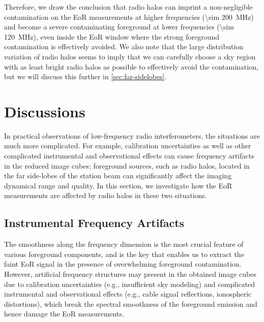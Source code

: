 \documentclass[modern]{aastex62}
\begin{document}
{Therefore, we draw the conclusion that radio halos can imprint a
non-negligible contamination on the EoR measurements at higher
frequencies (\SI{\sim 200}{\MHz}) and become a severe contaminating
foreground at lower frequencies (\SI{\sim 120}{\MHz}),
even inside the EoR window where the strong foreground
contamination is effectively avoided.
We also note that the large distribution variation of radio halos seems
to imply that we can carefully choose a sky region with as least bright
radio halos as possible to effectively avoid the contamination,
but we will discuss this further in \autoref{sec:far-sidelobes}.
} %


\section{Discussions}
\label{sec:discussions}

{\color{cyan}%
In practical observations of low-frequency radio interferometers, the
situations are much more complicated.
For example, calibration uncertainties as well as other complicated
instrumental and observational effects can cause frequency artifacts
in the reduced image cubes;
foreground sources, such as radio halos, located in the far side-lobes
of the station beam can significantly affect the imaging dynamical range
and quality.
In this section, we investigate how the EoR measurements are affected
by radio halos in these two situations.} %

\subsection{Instrumental Frequency Artifacts}
\label{sec:freq-artifacts}

The smoothness along the frequency dimension is the most crucial feature
of various foreground components, and is the key that enables us to
extract the faint EoR signal in the presence of overwhelming foreground
contamination.
However, artificial frequency structures may present in the obtained
image cubes due to calibration uncertainties (e.g., insufficient sky
modeling) and complicated instrumental and observational effects (e.g.,
cable signal reflections, ionospheric distortions), which break the
spectral smoothness of the foreground emission and hence damage the
EoR measurements.
\end{document}
